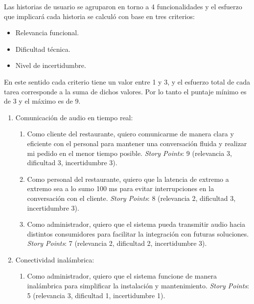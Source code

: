 \documentclass[
11pt, %
]{charter}
\newcommand{\storyPoints}{\textit{Story Points}}
\begin{document}
Las historias de usuario se agruparon en torno a 4 funcionalidades y el esfuerzo que implicará cada historia se calculó con base en tres criterios:

\begin{itemize}
	\item Relevancia funcional.
	\item Dificultad técnica.
	\item Nivel de incertidumbre.
\end{itemize}

En este sentido cada criterio tiene un valor entre 1 y 3, y el esfuerzo total de cada tarea corresponde a la suma de dichos valores. Por lo tanto el puntaje mínimo es de 3 y el máximo es de 9.

\begin{enumerate}

	\item Comunicación de audio en tiempo real:

	\begin{enumerate}
			
		\item Como cliente del restaurante, quiero comunicarme de manera clara y eficiente con el personal para mantener una conversación fluida y realizar mi pedido en el menor tiempo posible. \storyPoints{}: 9 (relevancia 3, dificultad 3, incertidumbre 3).
		
		\item Como personal del restaurante, quiero que la latencia de extremo a extremo sea a lo sumo 100 ms para evitar interrupciones en la conversación con el cliente. \storyPoints{}: 8 (relevancia 2, dificultad 3, incertidumbre 3).
	
		\item Como administrador, quiero que el sistema pueda transmitir audio hacia distintos consumidores para facilitar la integración con futuras soluciones. \storyPoints{}: 7 (relevancia 2, dificultad 2, incertidumbre 3).
	
	\end{enumerate}

	\item Conectividad inalámbrica:
	
		\begin{enumerate}
			\item Como administrador, quiero que el sistema funcione de manera inalámbrica para simplificar la instalación y mantenimiento. \storyPoints{}: 5 (relevancia 3, dificultad 1, incertidumbre 1).
			

\end{enumerate}
\end{enumerate}
\end{document}

